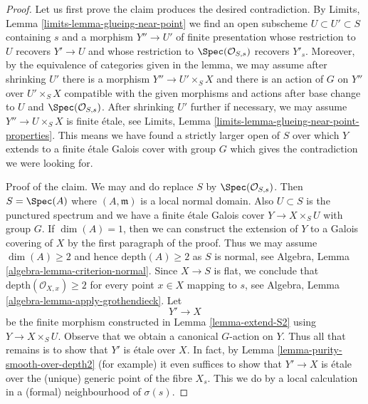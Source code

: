 \begin{proof}
\medskip\noindent
Let us first prove the claim produces the desired contradiction.
By Limits, Lemma \ref{limits-lemma-glueing-near-point}
we find an open subscheme $U \subset U' \subset S$
containing $s$ and a morphism $Y'' \to U'$ of finite presentation
whose restriction to $U$ recovers $Y' \to U$ and
whose restriction to $\Spec(\mathcal{O}_{S, s})$ recovers $Y'_s$.
Moreover, by the equivalence of categories given in the
lemma, we may assume after shrinking $U'$
there is a morphism $Y'' \to U' \times_S X$
and there is an action of $G$ on $Y''$ over $U' \times_S X$
compatible with the given morphisms and actions after base
change to $U$ and $\Spec(\mathcal{O}_{S, s})$.
After shrinking $U'$ further if necessary, we may
assume $Y'' \to U \times_S X$ is finite \'etale, see
Limits, Lemma \ref{limits-lemma-glueing-near-point-properties}.
This means we have found a strictly larger open of $S$ over which
$Y$ extends to a finite \'etale Galois cover with group $G$
which gives the contradiction we were looking for.

\medskip\noindent
Proof of the claim. We may and do replace $S$ by $\Spec(\mathcal{O}_{S, s})$.
Then $S = \Spec(A)$ where $(A, \mathfrak m)$ is a local normal domain.
Also $U \subset S$ is the punctured spectrum and we have a finite
\'etale Galois cover $Y \to X \times_S U$ with group $G$.
If $\dim(A) = 1$, then we can construct the extension of $Y$ to
a Galois covering of $X$ by the first paragraph of the proof.
Thus we may assume $\dim(A) \geq 2$ and hence $\text{depth}(A) \geq 2$
as $S$ is normal, see Algebra, Lemma \ref{algebra-lemma-criterion-normal}.
Since $X \to S$ is flat, we conclude that
$\text{depth}(\mathcal{O}_{X, x}) \geq 2$ for every point $x \in X$
mapping to $s$, see
Algebra, Lemma \ref{algebra-lemma-apply-grothendieck}.
Let
$$
Y' \longrightarrow X
$$
be the finite morphism constructed in Lemma \ref{lemma-extend-S2}
using $Y \to X \times_S U$. Observe that we obtain a canonical
$G$-action on $Y$. Thus all that remains is to show that $Y'$
is \'etale over $X$. In fact, by
Lemma \ref{lemma-purity-smooth-over-depth2} (for example)
it even suffices to show that $Y' \to X$ is \'etale over the
(unique) generic point of the fibre $X_s$. This we do by
a local calculation in a (formal) neighbourhood of $\sigma(s)$.


\end{proof}
